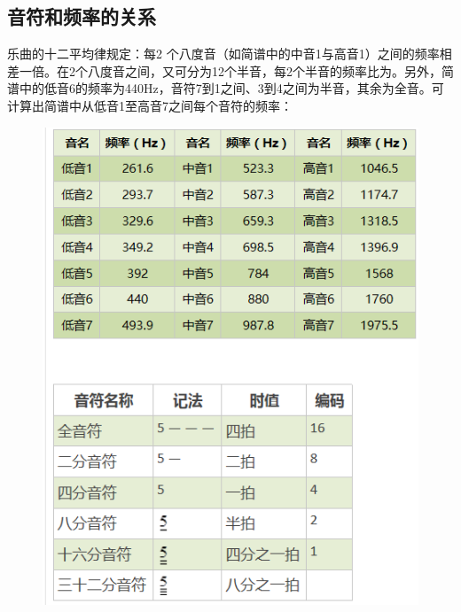 \documentclass[UTF8]{ctexart}
\begin{document}
\subsection{音符和频率的关系}
       乐曲的十二平均律规定：每2 个八度音（如简谱中的中音1与高音1）之间的频率相差一倍。在2个八度音之间，又可分为12个半音，每2个半音的频率比为。另外，简谱中的低音6的频率为440Hz，音符7到1之间、3到4之间为半音，其余为全音。可计算出简谱中从低音1至高音7之间每个音符的频率：
\begin{figure}[H]
  \centering
  \includegraphics[width=1\textwidth]{frequency.png}
\end{figure}
\end{document}
